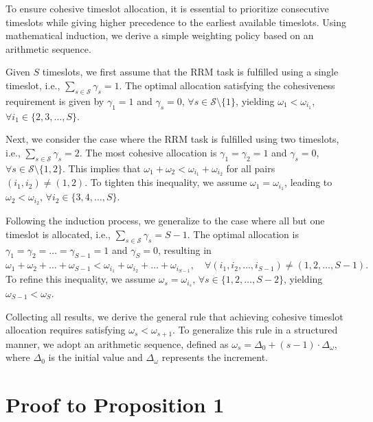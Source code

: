 \documentclass[10pt,journal,compsoc]{IEEEtran}
\theoremstyle{myremark}
\theoremstyle{myexample}
\begin{document}
\begin{appendices}
To ensure cohesive timeslot allocation, it is essential to prioritize consecutive timeslots while giving higher precedence to the earliest available timeslots. Using mathematical induction, we derive a simple weighting policy based on an arithmetic sequence.

Given $ S $ timeslots, we first assume that the \gls{RRM} task is fulfilled using a single timeslot, i.e., $ \sum_{s \in \mathcal{S}} \gamma_s = 1 $. The optimal allocation satisfying the cohesiveness requirement is given by $ \gamma_1 = 1 $ and $ \gamma_s = 0 $, $ \forall s \in \mathcal{S} \setminus \{1\} $, yielding $ \omega_1 < \omega_{i_1} $, $ \forall i_1 \in \{2, 3, \dots, S\} $.  

Next, we consider the case where the RRM task is fulfilled using two timeslots, i.e., $ \sum_{s \in \mathcal{S}} \gamma_s = 2 $. The most cohesive allocation is $ \gamma_1 = \gamma_2 = 1 $ and $ \gamma_s = 0 $, $ \forall s \in \mathcal{S} \setminus \{1,2\} $. This implies that $ \omega_1 + \omega_2 < \omega_{i_1} + \omega_{i_2} $ for all pairs $ (i_1, i_2) \neq (1,2) $. To tighten this inequality, we assume $ \omega_1 = \omega_{i_1} $, leading to $ \omega_2 < \omega_{i_2} $, $ \forall i_2 \in \{3, 4, \dots, S\} $.  

Following the induction process, we generalize to the case where all but one timeslot is allocated, i.e., $ \sum_{s \in \mathcal{S}} \gamma_s = S - 1 $. The optimal allocation is $ \gamma_1 = \gamma_2 = \dots = \gamma_{S-1} = 1 $ and $ \gamma_S = 0 $, resulting in $ \omega_1 + \omega_2 + \dots + \omega_{S-1} < \omega_{i_1} + \omega_{i_2} + \dots + \omega_{i_{S-1}}, \quad \forall (i_1, i_2, \dots, i_{S-1}) \neq (1,2,\dots,S-1). $
To refine this inequality, we assume $ \omega_s = \omega_{i_s} $, $ \forall s \in \{1, 2, \dots, S-2\} $, yielding $ \omega_{S-1} < \omega_S $.  

Collecting all results, we derive the general rule that achieving cohesive timeslot allocation requires satisfying $ \omega_s < \omega_{s+1} $. To generalize this rule in a structured manner, we adopt an arithmetic sequence, defined as
$ \omega_s = \Delta_0 + (s-1) \cdot \Delta_\omega $, where $ \Delta_0 $ is the initial value and $ \Delta_\omega $ represents the increment.  





\setcounter{equation}{0}
\setcounter{table}{0}
\renewcommand{\theequation}{G.\arabic{equation}}
\section{Proof to Proposition 1} \label{app:proof-proposition-1}


\end{appendices}
\end{document}
